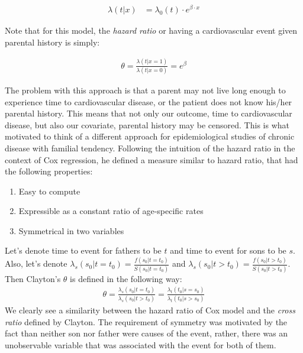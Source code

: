 \documentclass[]{article}
\begin{document}
$$
\begin{aligned}
	\lambda(t|x) &= \lambda_0(t) \cdot e^{\beta\cdot x}
\end{aligned}
$$

Note that for this model, the \emph{hazard ratio} or having a cardiovascular event given parental history is simply:

$$
\begin{aligned}
 \theta = \frac{\lambda(t|x=1)}{\lambda(t|x=0)} = e^{\beta}
 \end{aligned}
$$
 
The problem with this approach is that a parent may not live long enough to experience time to cardiovascular disease, or the patient does not know his/her parental history. This means that not only our outcome, time to cardiovascular disease, but also our covariate, parental history may be censored. This is what motivated \cite{clayton1978model} to think of a different approach for epidemiological studies of chronic disease with familial tendency. Following the intuition of the hazard ratio in the context of Cox regression, he defined a measure similar to hazard ratio, that had the following properties:
\begin{enumerate}
	\item Easy to compute
	\item Expressible as a constant ratio of age-specific rates
  \item Symmetrical in two variables
\end{enumerate}
Let's denote time to event for fathers to be $t$ and time to event for sons to be $s$. Also, let's denote $\lambda_s(s_0|t=t_0) = \frac{f(s_0|t=t_0)}{S(s_0|t=t_0)}$ and $\lambda_s(s_0|t>t_0) = \frac{f(s_0|t>t_0)}{S(s_0|t>t_0)}$. Then Clayton's $\theta$ is defined in the following way:
$$
\begin{aligned}
	\theta = \frac{\lambda_s(s_0|t=t_0)}{\lambda_s(s_0|t>t_0)} = \frac{\lambda_t(t_0|s=s_0)}{\lambda_t(t_0|s>s_0)}
\end{aligned}
$$
We clearly see a similarity between the hazard ratio of Cox model and the \emph{cross ratio} defined by Clayton. The requirement of symmetry was motivated by the fact than neither son nor father were causes of the event, rather, there was an unobservable variable that was associated with the event for both of them.\\
\end{document}
